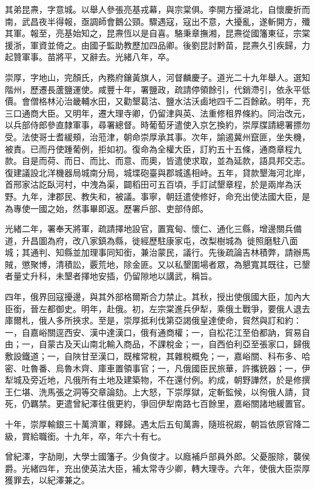 \begin{pinyinscope}
其弟昆燾，字意城。以舉人參張亮基戎幕，與宗棠俱。李開方擾湖北，自懷慶折而南，武昌夜半得報，亟調師會鵝公頸。驟遇寇，寇出不意，大擾亂，遂斬開方，殲其軍。報至，亮基始知之，昆燾恆以是自喜。駱秉章撫湘，昆燾從國籓東征，宗棠援浙，軍資並倚之。由國子監助教歷加四品卿。後劉昆討黔苗，昆燾久引疾歸，力起贊軍事。苗將平，又辭去。光緒八年，卒。

崇厚，字地山，完顏氏，內務府鑲黃旗人，河督麟慶子。道光二十九年舉人。選知階州，歷遷長蘆鹽運使。咸豐十年，署鹽政，疏請停領餘引，代銷滯引，依永平低價。會僧格林沁治畿輔水田，又勸墾葛沽、鹽水沽沃鹵地四千二百餘畝。明年，充三口通商大臣。又明年，遷大理寺卿，仍留津與英、法重修租界條約。同治改元，以兵部侍郎參直隸軍事，尋署總督。時葡萄牙遣使入京乞換約，崇厚牒請總署摽勿受。法使哥士耆緩頰，治蒞津，朝命崇厚承其事。次年，諭遏冀州竄匪，坐失機，被責。已而丹使踵葡例，拒如初。復命為全權大臣，訂約五十五條，通商章程九款。自是而荷、而日、而比、而意、而奧，皆遣使求取，並為延款，語具邦交志。復建議設北洋機器局城南分局，城堞砲臺與郡城遙相峙。五年，貸款墾海河北岸，首邢家沽訖臥河村，中洩為渠，闢稻田可五百頃，手訂試墾章程，於是兩岸為沃野。九年，津郡民、教失和，被議。事寧，朝廷遣使修好，命充出使法國大臣，是為專使一國之始，然事畢即返。歷署戶部、吏部侍郎。

光緒二年，署奉天將軍，疏請擇地設官，置寬甸、懷仁、通化三縣，增邊關兵備道，升昌圖為府，改八家鎮為縣，徙經歷駐康家屯，改梨樹城為，徙照磨駐八面城；其通判、知縣並加理事同知銜，兼治蒙民，議行。先後疏論吉林積弊，請辦馬賊，懲聚博，清積訟，覈荒地，除金匪。又以私墾圍場者眾，為懇寬其既往，已墾者量丈升科，未墾者擇地安插，仍留隙地以講武，稱旨。

四年，俄界回寇擾邊，與其外部格爾斯合力禁止。其秋，授出使俄國大臣，加內大臣銜，晉左都御史。明年，赴俄。初，左宗棠進兵伊犁，乘俄土戰爭，要俄人退去庫爾札，俄人多所挾求。至是，崇厚抵利伐第亞謁俄皇達使命，貿然與訂和約：一，自嘉峪關逕西安、漢中達漢口，俄有通商權；一，自松花江至伯都訥，貿易自由；一，自蒙古及天山南北輸入商品，不課稅金；一，自西伯利亞至張家口，歸俄敷設鐵道；一，自陜甘至漢口，既榷常稅，其雜稅概免；一，嘉峪關、科布多、哈密、吐魯番、烏魯木齊、庫車置領事官；一，凡俄國臣民旅華，許攜銃器；一，伊犁城及旁近地，凡俄所有土地及建築物，不在還付例。約成，朝野譁然，於是修撰王仁堪、洗馬張之洞等交章論劾。上大怒，下崇厚獄，定斬監候，以徇俄人請，貸死，仍羈禁。更遣曾紀澤往俄更約，爭回伊犁南路七百餘里，嘉峪關諸地緩置官。

十年，崇厚輸銀三十萬濟軍，釋歸。遇太后五旬萬壽，隨班祝嘏，朝旨依原官降二級，賞給職銜。十九年，卒，年六十有七。

曾紀澤，字劼剛，大學士國籓子。少負俊才。以廕補戶部員外郎。父憂服除，襲侯爵。光緒四年，充出使英法大臣，補太常寺少卿，轉大理寺。六年，使俄大臣崇厚獲罪去，以紀澤兼之。


\end{pinyinscope}
